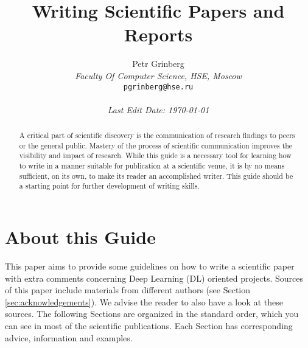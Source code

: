 \documentclass[10pt,conference,compsocconf]{IEEEtran}
\begin{document}
\title{Writing Scientific Papers and Reports}

\author{
  Petr Grinberg\\
  \textit{Faculty Of Computer Science, HSE, Moscow}\\
  \texttt{pgrinberg@hse.ru}\\ \ \\
  \textit{Last Edit Date: \today}
}

\maketitle

\begin{abstract}
  A critical part of scientific discovery is the
  communication of research findings to peers or the general public.
  Mastery of the process of scientific communication improves the
  visibility and impact of research. While this guide is a necessary
  tool for learning how to write in a manner suitable for publication
  at a scientific venue, it is by no means sufficient, on its own, to
  make its reader an accomplished writer. 
  This guide should be a starting point for further development of 
  writing skills.
\end{abstract}

\section*{About this Guide}
This paper aims to provide some guidelines on how to write a scientific paper with extra comments concerning Deep Learning (DL) oriented projects. Sources of this paper include materials from different authors (see Section \ref{sec:acknowledgements}). We advise the reader to also have a look at these sources. The following Sections are organized in the standard order, which you can see in most of the scientific publications. Each Section has corresponding advice, information and examples.
\end{document}
